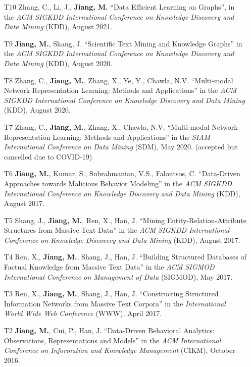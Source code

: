 \documentclass[10pt]{article}
\newenvironment{myindentpar}[1]%
{\begin{list}{}%
         {\setlength{\leftmargin}{#1}}%
         \item[]%
}
{\end{list}}
\newcounter{list}
\begin{document}
\begin{myindentpar}{0.00cm}
\begin{enumerate}[leftmargin=.5cm]
\item[T10] Zhang, C., Li, J., \textbf{Jiang, M.} ``Data Efficient Learning on Graphs'', in the \textit{ACM SIGKDD International Conference on Knowledge Discovery and Data Mining} (KDD), August 2021.
		
\item[T9] \textbf{Jiang, M.}, Shang, J. ``Scientific Text Mining and Knowledge Graphs'' in the \textit{ACM SIGKDD International Conference on Knowledge Discovery and Data Mining} (KDD), August 2020.
		
\item[T8] Zhang, C., \textbf{Jiang, M.}, Zhang, X., Ye, Y., Chawla, N.V. ``Multi-modal Network Representation Learning: Methods and Applications'' in the \textit{ACM SIGKDD International Conference on Knowledge Discovery and Data Mining} (KDD), August 2020.

\item[T7] Zhang, C., \textbf{Jiang, M.}, Zhang, X., Chawla, N.V. ``Multi-modal Network Representation Learning: Methods and Applications'' in the \textit{SIAM International Conference on Data Mining} (SDM), May 2020. (accepted but cancelled due to COVID-19)

\item[T6] \textbf{Jiang, M.}, Kumar, S., Subrahmanian, V.S., Faloutsos, C. ``Data-Driven Approaches towards Malicious Behavior Modeling'' in the \textit{ACM SIGKDD International Conference on Knowledge Discovery and Data Mining} (KDD), August 2017.

\item[T5] Shang, J., \textbf{Jiang, M.}, Ren, X., Han, J. ``Mining Entity-Relation-Attribute Structures from Massive Text Data'' in the \textit{ACM SIGKDD International Conference on Knowledge Discovery and Data Mining} (KDD), August 2017.

\item[T4] Ren, X., \textbf{Jiang, M.}, Shang, J., Han, J. ``Building Structured Databases of Factual Knowledge from Massive Text Data'' in the \textit{ACM SIGMOD International Conference on Management of Data} (SIGMOD), May 2017.
		
\item[T3] Ren, X., \textbf{Jiang, M.}, Shang, J., Han, J. ``Constructing Structured Information Networks from Massive Text Corpora'' in the \textit{International World Wide Web Conference}  (WWW), April 2017.

\item[T2] \textbf{Jiang, M.}, Cui, P., Han, J. ``Data-Driven Behavioral Analytics: Observations, Representations and Models'' in the \textit{ACM International Conference on Information and Knowledge Management} (CIKM), October 2016.
		

\end{enumerate}
\end{myindentpar}
\end{document}
